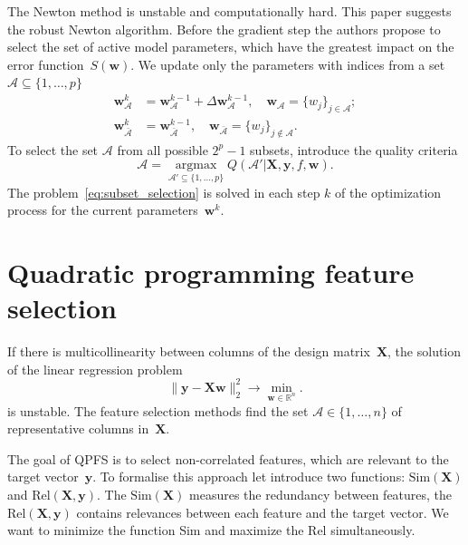 \documentclass[
11pt,%
tightenlines,%
twoside,%
onecolumn,%
nofloats,%
nobibnotes,%
nofootinbib,%
superscriptaddress,%
noshowpacs,%
centertags]%
{revtex4}
\newcommand{\bw}{\mathbf{w}}
\newcommand{\by}{\mathbf{y}}
\newcommand{\cA}{\mathcal{A}}
\newcommand{\bbR}{\mathbb{R}}
\newcommand{\bX}{\mathbf{X}}
\newcommand{\argmax}{\mathop{\arg \max}\limits}
\begin{document}
The Newton method is unstable and computationally hard. 
This paper suggests the robust Newton algorithm. 
Before the gradient step the authors propose to select the set of active model parameters, which have the greatest impact on the error function~$S(\bw)$.
We update only the parameters with indices from a set $\cA \subseteq \{ 1, \dots, p \}$
\begin{align*}
\bw_{\cA}^k &= \bw_{\cA}^{k - 1} + \Delta \bw_{\cA}^{k - 1}, \quad \bw_{\cA} = \{w_j\}_{j \in \cA}; \\
\bw_{\bar{\cA}}^k &= \bw_{\bar{\cA}}^{k - 1}, \quad \bw_{\bar{\cA}} = \{w_j\}_{j \notin \cA}.
\end{align*}
To select the set $\cA$ from all possible $2^p - 1$ subsets, introduce the quality criteria 
\begin{equation}
\cA = \argmax_{\cA' \subseteq \{1, \dots, p\}} Q(\cA' | \bX, \by, f, \bw).
\label{eq:subset_selection}
\end{equation}
The problem~\eqref{eq:subset_selection} is solved in each step $k$ of the optimization process for the current parameters~$\bw^k$.

\section{Quadratic programming feature selection}
If there is multicollinearity between columns of the design matrix~$\bX$, the solution of the linear regression problem
\begin{equation}
\| \by - \bX \bw\|_2^2 \rightarrow\min_{\bw \in \bbR^{n}}.
\label{eq:linear_regression}
\end{equation}
is unstable. 
The feature selection methods find the set $\cA \in \{1, \dots, n\}$ of representative columns in~$\bX$. 

The goal of QPFS is to select non-correlated features, which are relevant to the target vector~$\by$.
To formalise this approach let introduce two functions: $\text{Sim}(\bX)$ and $\text{Rel}(\bX, \by)$. 
The $\text{Sim}(\bX)$ measures the redundancy between features, the $\text{Rel}(\bX, \by)$ contains relevances between each feature and the target vector. 
We want to minimize the function Sim and maximize the Rel simultaneously.
\end{document}
